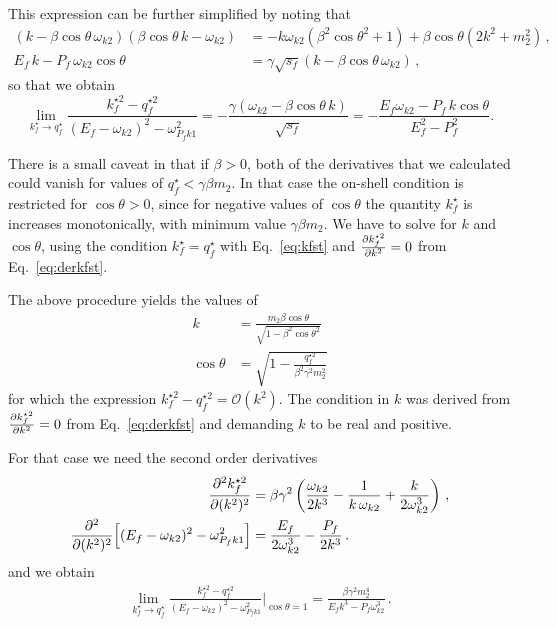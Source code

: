 \documentclass[aps,prd,onecolumn,groupedaddress]{revtex4-2}
\begin{document}
This expression can be further simplified by noting that
\begin{align}
    (k- \beta\cos\theta\,\omega_{k2})(\beta\cos\theta\, k - \omega_{k2})
    &= -k\omega_{k2}(\beta^2\cos\theta^2+1) + \beta\cos\theta(2k^2+m_2^2)\,,\\
    E_f \,k-P_f \,\omega_{k2}\cos\theta &= \gamma\sqrt{s_f}(k-\beta\cos\theta\,\omega_{k2})\,,
\end{align}
so that we obtain
\begin{equation}
     \lim_{k^{\star}_f\to q^\star_f} \frac{ k^{\star2}_f- q^{\star2}_f}{(E_f-\omega_{k2})^2-\omega_{P_fk1}^2}
     = -\frac{\gamma(\omega_{k2}-\beta\cos\theta\,k)}{\sqrt{s_f}}= -\frac{E_f\omega_{k2}-P_f\,k\cos\theta}{E_f^2-P_f^2}.
\end{equation}

There is a small caveat in that if $\beta>0$, both of the derivatives that we calculated could vanish for values of $q_f^\star<\gamma \beta m_2$.
In that case the on-shell condition is restricted for $\cos\theta>0$, since for negative values of $\cos\theta$ the quantity $k^\star_f$ is increases monotonically, with minimum value $\gamma \beta m_2$.
We have to solve for $k$ and $\cos\theta$, using the condition $k^{\star}_f= q^\star_f$ with Eq.~\eqref{eq:kfst} and $\pdv{k^{\star2}_f}{k^{2}} =0$ from Eq.~\eqref{eq:derkfst}.

The above procedure yields the values of 
\begin{align}
    k &= \frac{ m_2 \beta\cos\theta}{\sqrt{1-\beta ^2 \cos\theta^2}}\\
    \cos\theta &= \sqrt{1-\frac{q_f^{\star2}}{\beta ^2 \gamma ^2 m^2_2}}
\end{align}
for which the expression $k_f^{\star2}-q_f^{\star2}=\mathcal{O}(k^2)$.
The condition in $k$ was derived from $\pdv{k^{\star2}_f}{k^{2}}=0$ from Eq.~\eqref{eq:derkfst} and demanding $k$ to be real and positive.



For that case we need the second order derivatives
\begin{align}
    \pdv[2]{k^{\star2}_f}{(k^{2})}&= \beta  \gamma ^2 \left(\frac{\omega_{k2} }{2 k^{3}}-\frac{1}{k\, \omega_{k2}}+\frac{k
   }{2 \omega_{k2}^{3}}\right)\,,\\
    \pdv[2]{(k^{2})} \qty[(E_f-\omega_{k2})^2-\omega_{P_fk1}^2]
& = \frac{E_f}{2\omega_{k2}^3}-\frac{P_f}{2k^3}\,.
\end{align}
and we obtain
\begin{align}
    \lim_{k^{\star}_f\to q^\star_f} \frac{ k^{\star2}_f- q^{\star2}_f}{(E_f-\omega_{k2})^2-\omega_{P_fk1}^2}
    \bigg|_{\cos\theta=1}
    = \frac{\beta  \gamma ^2 m_2^4}{E_f k^3-P_f\omega_{k2}^{3}}\,.
\end{align}
\end{document}
